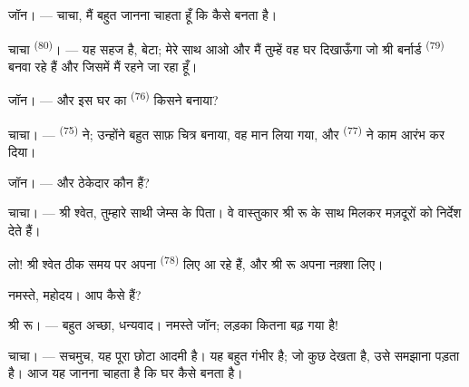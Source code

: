 %
%

\VUsaut{6.0mm}
\VUsaut{1.4mm}
\VUsaut{2.2mm}

\VUsaut{3.0mm}

\textsc{जॉन}। --- चाचा, मैं बहुत जानना चाहता हूँ कि  कैसे बनता है।

\textsc{चाचा} \textsuperscript{(80)}। --- यह सहज है, बेटा; मेरे साथ आओ और मैं
तुम्हें वह घर दिखाऊँगा जो श्री बर्नार्ड \textsuperscript{(79)} बनवा रहे हैं और
जिसमें मैं रहने जा रहा हूँ।

\textsc{जॉन}। --- और इस घर का  \textsuperscript{(76)} किसने बनाया?

\textsc{चाचा}। ---  \textsuperscript{(75)} ने; उन्होंने बहुत
साफ़ चित्र बनाया, वह मान लिया गया, और  \textsuperscript{(77)} ने
काम आरंभ कर दिया।

\textsc{जॉन}। --- और ठेकेदार कौन हैं?

\textsc{चाचा}। --- श्री श्वेत, तुम्हारे साथी जेम्स के पिता। वे वास्तुकार श्री रू
के साथ मिलकर मज़दूरों को निर्देश देते हैं।

लो! श्री श्वेत ठीक समय पर अपना  \textsuperscript{(78)} लिए आ रहे
हैं, और श्री रू अपना नक़्शा लिए।

नमस्ते, महोदय। आप कैसे हैं?

\textsc{श्री रू}। --- बहुत अच्छा, धन्यवाद। नमस्ते जॉन; लड़का कितना बढ़ गया है!

\textsc{चाचा}। --- सचमुच, यह पूरा छोटा आदमी है। यह बहुत गंभीर है; जो कुछ देखता
है, उसे समझाना पड़ता है। आज यह जानना चाहता है कि घर कैसे बनता है।


